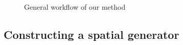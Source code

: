 \documentclass[Afour,sageh,times]{sagej}
\begin{document}
\begin{figure}[htbp] \begin{center} 
 \caption{General workflow of our method} \label{fig:method} \end{center} \end{figure} %

\subsection{Constructing a spatial generator}
\end{document}
